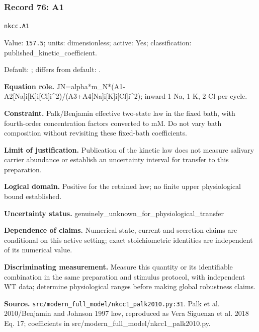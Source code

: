 \subsubsection*{Record 76: A1}
{\small \nolinkurl{nkcc.A1}\par

Value: \texttt{157.5}; units: dimensionless; active: Yes; classification: published\_kinetic\_coefficient.\par

Default: ; differs from default: .\par

\textbf{Equation role.} JN=alpha*m\_N*(A1-A2[Na]i[K]i[Cl]i\textasciicircum{}2)/(A3+A4[Na]i[K]i[Cl]i\textasciicircum{}2); inward 1 Na, 1 K, 2 Cl per cycle.\par

\textbf{Constraint.} Palk/Benjamin effective two-state law in the fixed bath, with fourth-order concentration factors converted to mM. Do not vary bath composition without revisiting these fixed-bath coefficients.\par

\textbf{Limit of justification.} Publication of the kinetic law does not measure salivary carrier abundance or establish an uncertainty interval for transfer to this preparation.\par

\textbf{Logical domain.} Positive for the retained law; no finite upper physiological bound established.\par

\textbf{Uncertainty status.} genuinely\_unknown\_for\_physiological\_transfer\par

\textbf{Dependence of claims.} Numerical state, current and secretion claims are conditional on this active setting; exact stoichiometric identities are independent of its numerical value.\par

\textbf{Discriminating measurement.} Measure this quantity or its identifiable combination in the same preparation and stimulus protocol, with independent WT data; determine physiological ranges before making global robustness claims.\par

\textbf{Source.} \nolinkurl{src/modern_full_model/nkcc1_palk2010.py:31}. Palk et al. 2010/Benjamin and Johnson 1997 law, reproduced as Vera Siguenza et al. 2018 Eq. 17; coefficients in src/modern\_full\_model/nkcc1\_palk2010.py.\par}

